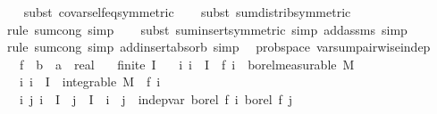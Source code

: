 \begin{isabellebody}
\ \ \isamarkupfalse%
\ {\isacharparenleft}{\kern0pt}subst\ covar{\isacharunderscore}{\kern0pt}self{\isacharunderscore}{\kern0pt}eq{\isacharbrackleft}{\kern0pt}symmetric{\isacharbrackright}{\kern0pt}{\isacharparenright}{\kern0pt}\isanewline
\ \ \isamarkupfalse%
\ {\isacharparenleft}{\kern0pt}subst\ sum{\isachardot}{\kern0pt}distrib{\isacharbrackleft}{\kern0pt}symmetric{\isacharbrackright}{\kern0pt}{\isacharparenright}{\kern0pt}\isanewline
\ \ \isamarkupfalse%
\ {\isacharparenleft}{\kern0pt}rule\ sum{\isachardot}{\kern0pt}cong{\isacharcomma}{\kern0pt}\ simp{\isacharparenright}{\kern0pt}\isanewline
\ \ \isamarkupfalse%
\ {\isacharparenleft}{\kern0pt}subst\ sum{\isachardot}{\kern0pt}insert{\isacharbrackleft}{\kern0pt}symmetric{\isacharbrackright}{\kern0pt}{\isacharcomma}{\kern0pt}\ simp\ add{\isacharcolon}{\kern0pt}assms{\isacharcomma}{\kern0pt}\ simp{\isacharparenright}{\kern0pt}\isanewline
\ \ \isamarkupfalse%
\ {\isacharparenleft}{\kern0pt}rule\ sum{\isachardot}{\kern0pt}cong{\isacharcomma}{\kern0pt}\ simp\ add{\isacharcolon}{\kern0pt}insert{\isacharunderscore}{\kern0pt}absorb{\isacharcomma}{\kern0pt}\ simp{\isacharparenright}{\kern0pt}%
\endisatagproof
{\isafoldproof}%
%
\isadelimproof
\isanewline
%
\endisadelimproof
\isanewline
{}\isamarkupfalse%
\ {\isacharparenleft}{\kern0pt}\ prob{\isacharunderscore}{\kern0pt}space{\isacharparenright}{\kern0pt}\ var{\isacharunderscore}{\kern0pt}sum{\isacharunderscore}{\kern0pt}pairwise{\isacharunderscore}{\kern0pt}indep{\isacharcolon}{\kern0pt}\isanewline
\ \ \ f\ {\isacharcolon}{\kern0pt}{\isacharcolon}{\kern0pt}\ {\isachardoublequoteopen}{\isacharprime}{\kern0pt}b\ {\isasymRightarrow}\ {\isacharprime}{\kern0pt}a\ {\isasymRightarrow}\ real{\isachardoublequoteclose}\isanewline
\ \ \ {\isachardoublequoteopen}finite\ I{\isachardoublequoteclose}\isanewline
\ \ \ {\isachardoublequoteopen}{\isasymAnd}i{\isachardot}{\kern0pt}\ i\ {\isasymin}\ I\ {\isasymLongrightarrow}\ f\ i\ {\isasymin}\ borel{\isacharunderscore}{\kern0pt}measurable\ M{\isachardoublequoteclose}\isanewline
\ \ \ {\isachardoublequoteopen}{\isasymAnd}i{\isachardot}{\kern0pt}\ i\ {\isasymin}\ I\ {\isasymLongrightarrow}\ integrable\ M\ {\isacharparenleft}{\kern0pt}{\isasymlambda}{\isasymomega}{\isachardot}{\kern0pt}\ f\ i\ {\isasymomega}{\isacharcircum}{\kern0pt}{}{\isacharparenright}{\kern0pt}{\isachardoublequoteclose}\isanewline
\ \ \ {\isachardoublequoteopen}{\isasymAnd}i\ j{\isachardot}{\kern0pt}\ i\ {\isasymin}\ I\ {\isasymLongrightarrow}\ j\ {\isasymin}\ I\ {\isasymLongrightarrow}\ i\ {\isasymnoteq}\ j\ {\isasymLongrightarrow}\ indep{\isacharunderscore}{\kern0pt}var\ borel\ {\isacharparenleft}{\kern0pt}f\ i{\isacharparenright}{\kern0pt}\ borel\ {\isacharparenleft}{\kern0pt}f\ j{\isacharparenright}{\kern0pt}{\isachardoublequoteclose}\isanewline

\end{isabellebody}
